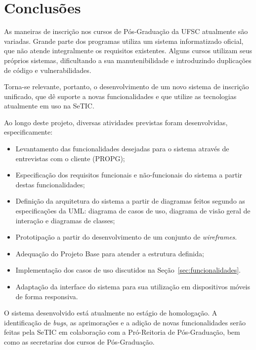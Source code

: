 \documentclass[
  10.5pt,				  %
	openright,			%
	twoside,			  %
  a5paper,
  chapter=TITLE,	%
	section=TITLE,	%
  hyphens,        %
	english,        %
	brazil          %
]{abntex2}
\begin{document}
\chapter{Conclusões}

As maneiras de inscrição nos cursos de Pós-Graduação da UFSC atualmente são variadas. Grande parte dos programas utiliza um sistema informatizado oficial, que não atende integralmente os requisitos existentes. Alguns cursos utilizam seus próprios sistemas, dificultando a sua manutenibilidade e introduzindo duplicações de código e vulnerabilidades.

Torna-se relevante, portanto, o desenvolvimento de um novo sistema de inscrição unificado, que dê suporte a novas funcionalidades e que utilize as tecnologias atualmente em uso na SeTIC.

Ao longo deste projeto, diversas atividades previstas foram desenvolvidas, especificamente:
\begin{itemize}
  \item Levantamento das funcionalidades desejadas para o sistema através de entrevistas com o cliente (PROPG);
  \item Especificação dos requisitos funcionais e não-funcionais do sistema a partir destas funcionalidades;
  \item Definição da arquitetura do sistema a partir de diagramas feitos segundo as especificações da UML: diagrama de casos de uso, diagrama de visão geral de interação e diagramas de classes;
  \item Prototipação a partir do desenvolvimento de um conjunto de \emph{wireframes}.
  \item Adequação do Projeto Base para atender a estrutura definida;
  \item Implementação dos casos de uso discutidos na Seção~\ref{sec:funcionalidades}.
  \item Adaptação da interface do sistema para sua utilização em dispositivos móveis de forma responsiva.
\end{itemize}

O sistema desenvolvido está atualmente no estágio de homologação. A identificação de \emph{bugs}, as aprimorações e a adição de novas funcionalidades serão feitas pela SeTIC em colaboração com a Pró-Reitoria de Pós-Graduação, bem como as secretarias dos cursos de Pós-Graduação.


\end{document}
